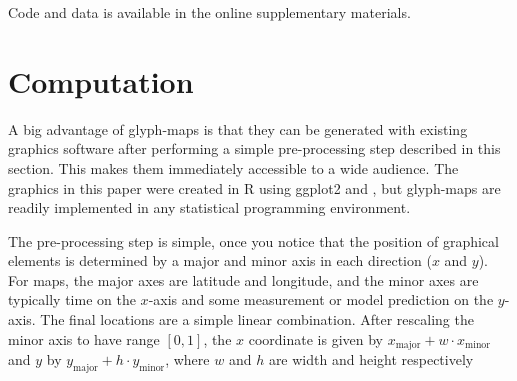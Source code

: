 \documentclass[oneside]{article}
\newcommand\amin{\text{minor}}
\newcommand\amaj{\text{major}}
\begin{document}




Code and data is available in the online supplementary materials.

\section{Computation}

A big advantage of glyph-maps is that they can be generated with existing graphics software after performing a simple pre-processing step described in this section. This makes them immediately accessible to a wide audience. The graphics in this paper were created in R \citep{R} using ggplot2 \citep{me:ggplot2,wickham:2007d} and \citep{me:plyr}, but glyph-maps are readily implemented in any statistical programming environment. 

The pre-processing step is simple, once you notice that the position of graphical elements is determined by a major and minor axis in each direction ($x$ and $y$). For maps, the major axes are latitude and longitude, and the minor axes are typically time on the $x$-axis and some measurement or model prediction on the $y$-axis. The final locations are a simple linear combination.  After rescaling the minor axis to have range $[0, 1]$, the $x$ coordinate is given by $x_{\amaj} + w \cdot x_{\amin}$ and $y$ by $y_{\amaj} + h \cdot y_{\amin}$, where $w$ and $h$ are width and height respectively
\end{document}
